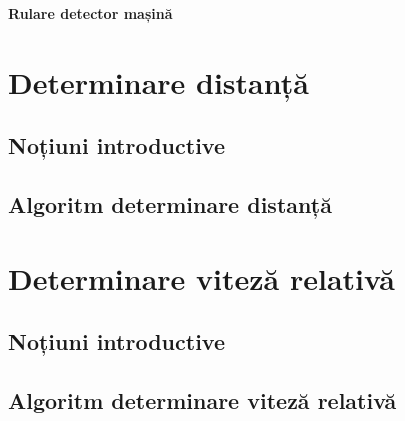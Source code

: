 \textbf{Rulare detector mașină}


\section{Determinare distanță}
\subsection{Noțiuni introductive}
\subsection{Algoritm determinare distanță}

\section{Determinare viteză relativă}
\subsection{Noțiuni introductive}
\subsection{Algoritm determinare viteză relativă}
